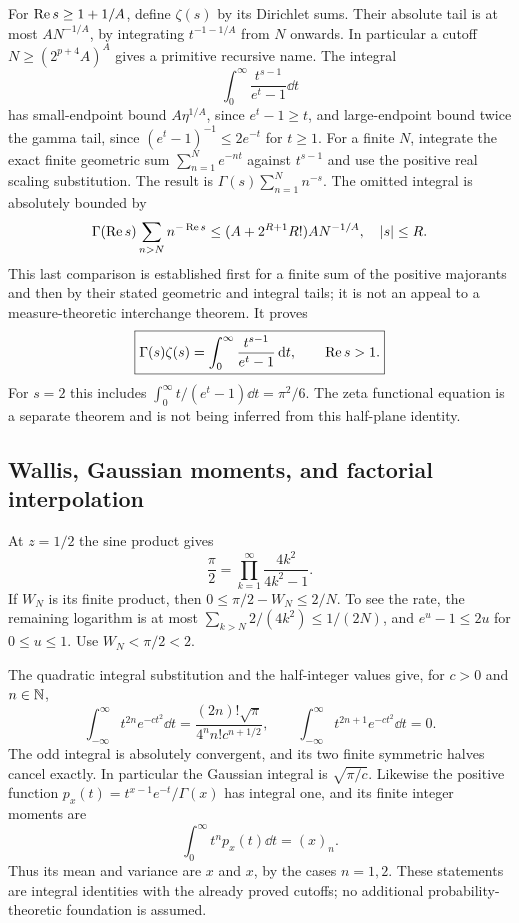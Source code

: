 For $\operatorname{Re} s\ge1+1/A$, define $\zeta(s)$ by its Dirichlet sums.
Their absolute tail is at most $A N^{-1/A}$, by integrating
$t^{-1-1/A}$ from $N$ onwards. In particular a cutoff
$N\ge(2^{p+4}A)^A$ gives a primitive recursive name. The integral
\[
 \int_0^\infty\frac{t^{s-1}}{e^t-1}\dd t
\]
has small-endpoint bound $A\eta^{1/A}$, since $e^t-1\ge t$,
and large-endpoint bound twice the gamma tail, since
$(e^t-1)^{-1}\le2e^{-t}$ for $t\ge1$.
For a finite $N$, integrate the exact finite geometric sum
$\sum_{n=1}^N e^{-nt}$ against $t^{s-1}$ and use the positive real
scaling substitution. The result is
$\Gamma(s)\sum_{n=1}^N n^{-s}$. The omitted integral is absolutely
bounded by
\[
 \Gamma(\operatorname{Re} s)\sum_{n>N}n^{-\operatorname{Re} s}
 \le (A+2^{R+1}R!)A N^{-1/A},\quad |s|\le R.
\]
This last comparison is established first for a finite sum of the
positive majorants and then by their stated geometric and integral
tails; it is not an appeal to a measure-theoretic interchange theorem.
It proves
\begin{equation}
 \boxed{\displaystyle
 \Gamma(s)\zeta(s)=\int_0^\infty\frac{t^{s-1}}{e^t-1}\,\mathrm d t,
 \qquad\operatorname{Re} s>1.}
 \label{eq:gamma-zeta-mellin}
\end{equation}
For $s=2$ this includes
$\int_0^\infty t/(e^t-1)\dd t=\pi^2/6$.
The zeta functional equation is a separate theorem and is not being
inferred from this half-plane identity.

\subsection{Wallis, Gaussian moments, and factorial interpolation}

At $z=1/2$ the sine product gives
\[
 \frac\pi2=\prod_{k=1}^{\infty}\frac{4k^2}{4k^2-1}.
\]
If $W_N$ is its finite product, then
$0\le\pi/2-W_N\le2/N$. To see the rate, the remaining logarithm is
at most $\sum_{k>N}2/(4k^2)\le1/(2N)$, and
$e^u-1\le2u$ for $0\le u\le1$. Use $W_N<\pi/2<2$.

The quadratic integral substitution and the half-integer values give,
for $c>0$ and $n\in\mathbb N$,
\[
 \int_{-\infty}^{\infty}t^{2n}e^{-ct^2}\dd t
   =\frac{(2n)!\sqrt\pi}{4^n n!c^{n+1/2}},\qquad
 \int_{-\infty}^{\infty}t^{2n+1}e^{-ct^2}\dd t=0.
\]
The odd integral is absolutely convergent, and its two finite symmetric
halves cancel exactly. In particular the Gaussian integral is
$\sqrt{\pi/c}$. Likewise the positive function
$p_x(t)=t^{x-1}e^{-t}/\Gamma(x)$ has integral one, and its finite
integer moments are
\[
 \int_0^\infty t^n p_x(t)\dd t=(x)_n.
\]
Thus its mean and variance are $x$ and $x$, by the cases $n=1,2$.
These statements are integral identities with the already proved
cutoffs; no additional probability-theoretic foundation is assumed.

